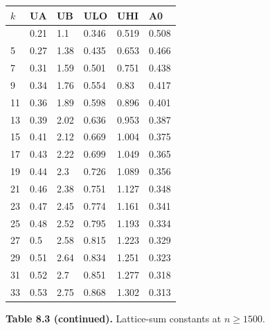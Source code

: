 \begin{longtable}[]{@{}llllll@{}}
\toprule\noalign{}
\(k\) & UA & UB & ULO & UHI & A0 \\
\midrule\noalign{}
\endhead
\bottomrule\noalign{}
\endlastfoot
3 & 0.21 & 1.1 & 0.346 & 0.519 & 0.508 \\
5 & 0.27 & 1.38 & 0.435 & 0.653 & 0.466 \\
7 & 0.31 & 1.59 & 0.501 & 0.751 & 0.438 \\
9 & 0.34 & 1.76 & 0.554 & 0.83 & 0.417 \\
11 & 0.36 & 1.89 & 0.598 & 0.896 & 0.401 \\
13 & 0.39 & 2.02 & 0.636 & 0.953 & 0.387 \\
15 & 0.41 & 2.12 & 0.669 & 1.004 & 0.375 \\
17 & 0.43 & 2.22 & 0.699 & 1.049 & 0.365 \\
19 & 0.44 & 2.3 & 0.726 & 1.089 & 0.356 \\
21 & 0.46 & 2.38 & 0.751 & 1.127 & 0.348 \\
23 & 0.47 & 2.45 & 0.774 & 1.161 & 0.341 \\
25 & 0.48 & 2.52 & 0.795 & 1.193 & 0.334 \\
27 & 0.5 & 2.58 & 0.815 & 1.223 & 0.329 \\
29 & 0.51 & 2.64 & 0.834 & 1.251 & 0.323 \\
31 & 0.52 & 2.7 & 0.851 & 1.277 & 0.318 \\
33 & 0.53 & 2.75 & 0.868 & 1.302 & 0.313 \\
\end{longtable}

\textbf{Table 8.3 (continued).} Lattice-sum constants at \(n\ge1500\).

